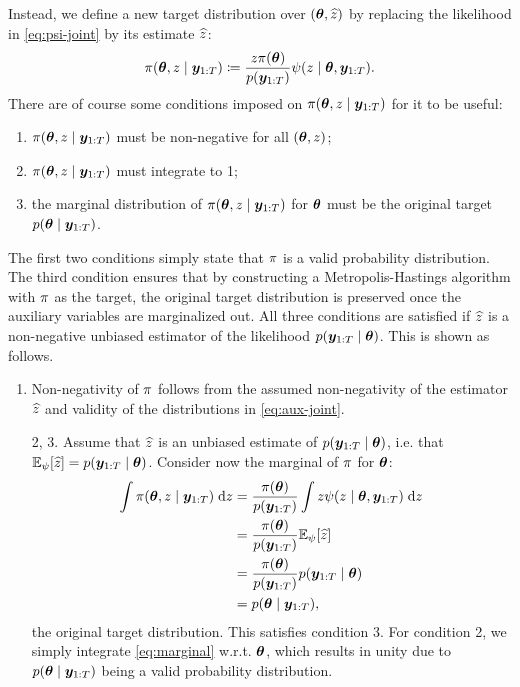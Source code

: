 Instead, we define a new target distribution over $(\bm{\theta}, \widehat{z})$ by replacing the likelihood in \eqref{eq:psi-joint} by its estimate $\widehat{z}$:
\begin{equation} \label{eq:aux-joint}
\pi(\bm{\theta}, z \mid \bm{y}_{1:T}) \coloneqq \frac{z \pi(\bm{\theta})}{p(\bm{y}_{1:T})} \psi(z \mid \bm{\theta}, \bm{y}_{1:T}).
\end{equation}
There are of course some conditions imposed on $\pi(\bm{\theta}, z \mid \bm{y}_{1:T})$ for it to be useful:
\begin{enumerate}
    \item $\pi(\bm{\theta}, z \mid \bm{y}_{1:T})$ must be non-negative for all $(\bm{\theta}, z)$;
    \item $\pi(\bm{\theta}, z \mid \bm{y}_{1:T})$ must integrate to 1;
    \item the marginal distribution of $\pi(\bm{\theta}, z \mid \bm{y}_{1:T})$ for $\bm{\theta}$ must be the original target $p(\bm{\theta} \mid \bm{y}_{1:T})$.
\end{enumerate}
The first two conditions simply state that $\pi$ is a valid probability distribution. The third condition ensures that by constructing a Metropolis-Hastings algorithm with $\pi$ as the target, the original target distribution is preserved once the auxiliary variables are marginalized out. All three conditions are satisfied if $\widehat{z}$ is a non-negative unbiased estimator of the likelihood $p(\bm{y}_{1:T} \mid \bm{\theta})$. This is shown as follows.

\begin{enumerate}[align=left]
    \item Non-negativity of $\pi$ follows from the assumed non-negativity of the estimator $\widehat{z}$ and validity of the distributions in \eqref{eq:aux-joint}.
    \item[2, 3.] Assume that $\widehat{z}$ is an unbiased estimate of $p(\bm{y}_{1:T} \mid \bm{\theta})$, i.e. that $\mathbb{E}_{\psi}[\widehat{z}] = p(\bm{y}_{1:T} \mid \bm{\theta})$. Consider now the marginal of $\pi$ for $\bm{\theta}$:
    \begin{equation} \label{eq:marginal}
    \begin{split}
    \int \pi(\bm{\theta}, z \mid \bm{y}_{1:T})\; \mathrm{d}{z} & = \frac{\pi(\bm{\theta})}{p(\bm{y}_{1:T})} \int z \psi(z \mid \bm{\theta}, \bm{y}_{1:T}) \; \mathrm{d}{z} \\
    & = \frac{\pi(\bm{\theta})}{p(\bm{y}_{1:T})} \mathbb{E}_{\psi}[\widehat{z}] \\
    & = \frac{\pi(\bm{\theta})}{p(\bm{y}_{1:T})} p(\bm{y}_{1:T} \mid \bm{\theta}) \\
    & = p(\bm{\theta} \mid \bm{y}_{1:T}),
    \end{split}
    \end{equation}
    the original target distribution. This satisfies condition 3. For condition 2, we simply integrate \eqref{eq:marginal} w.r.t. $\bm{\theta}$, which results in unity due to $p(\bm{\theta} \mid \bm{y}_{1:T})$ being a valid probability distribution.
\end{enumerate}

